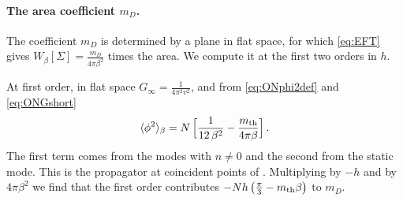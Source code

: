 \documentclass[a4paper,11pt]{article}
\begin{document}
\paragraph{The area coefficient $m_D$.}
The coefficient $m_D$ is determined by a plane in flat space, for which \eqref{eq:EFT} gives $W_\beta[\Sigma]=\tfrac{m_D}{4\pi\beta^2}$ times the area. We compute it at the first two orders in $h$.

At first order, in flat space $G_\infty=\tfrac{1}{4\pi^2v^2}$, and from \eqref{eq:ONphi2def} and \eqref{eq:ONGshort}
\begin{equation}\label{eq:ONphi2flat}
	\langle\phi^2\rangle_\beta=N\,\Bigl[\frac{1}{12\,\beta^2}-\frac{m_{\rm th}}{4\pi\beta}\Bigr]\, .
\end{equation}
The first term comes from the modes with $n\neq0$ and the second from the static mode. This is the propagator at coincident points of \cite{Barrat:2026ozj}. Multiplying by $-h$ and by $4\pi\beta^2$ we find that the first order contributes $-N h\,\bigl(\tfrac\pi3-m_{\rm th}\beta\bigr)$ to $m_D$.
\end{document}
